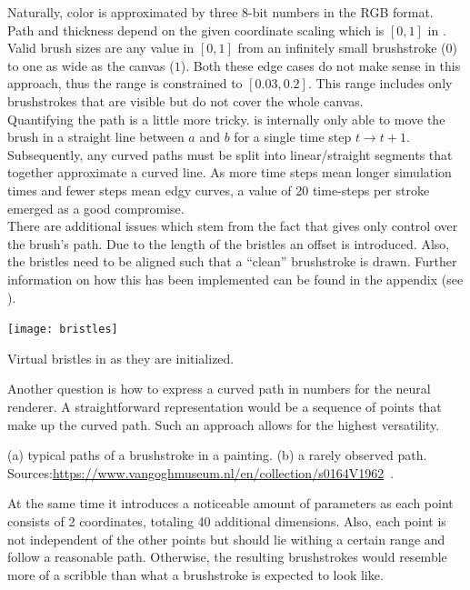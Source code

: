 Naturally, color is approximated by three 8-bit numbers in the RGB format.\\
Path and thickness depend on the given coordinate scaling which is $[0, 1]$ in .
Valid brush sizes are any value in $[0, 1]$ from an infinitely small brushstroke ($0$) to one as wide as the canvas ($1$).
Both these edge cases do not make sense in this approach, thus the range is constrained to $[0.03, 0.2]$.
This range includes only brushstrokes that are visible but do not cover the whole canvas.\\

Quantifying the path is a little more tricky.
 is internally only able to move the brush in a straight line between $a$ and $b$ for a single time step $t \rightarrow t+1$.
Subsequently, any curved paths must be split into linear/straight segments that together approximate a curved line.
As more time steps mean longer simulation times and fewer steps mean edgy curves, a value of 20 time-steps per stroke emerged as a good compromise.\\
There are additional issues which stem from the fact that  gives only control over the brush's path.
Due to the length of the bristles an offset is introduced.
Also, the bristles need to be aligned such that a ``clean'' brushstroke is drawn.
Further information on how this has been implemented can be found in the appendix (see ).
\begin{marginfigure}
    \texttt{[image: bristles]}
    \caption[]{Virtual bristles in  as they are initialized.}
\end{marginfigure}

Another question is how to express a curved path in numbers for the neural renderer.
A straightforward representation would be a sequence of points that make up the curved path.
Such an approach allows for the highest versatility.
\begin{marginfigure}
    \qquad
    \qquad
    \caption[]{(a) typical paths of a brushstroke in a painting. (b) a rarely observed path. Sources:\url{https://www.vangoghmuseum.nl/en/collection/s0164V1962}~\cite{zolee}.}
\end{marginfigure}
At the same time it introduces a noticeable amount of parameters as each point consists of 2 coordinates, totaling 40 additional dimensions.
Also, each point is not independent of the other points but should lie withing a certain range and follow a reasonable path. 
Otherwise, the resulting brushstrokes would resemble more of a scribble than what a brushstroke is expected to look like.

